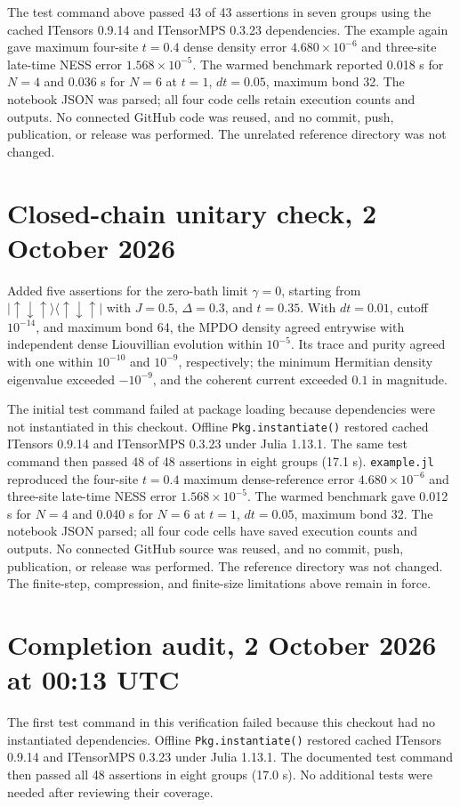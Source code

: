 \documentclass[11pt]{article}
\begin{document}
The test command above passed 43 of 43 assertions in seven groups using
the cached ITensors 0.9.14 and ITensorMPS 0.3.23 dependencies. The example
again gave maximum four-site $t=0.4$ dense density error
$4.680\times10^{-6}$ and three-site late-time NESS error
$1.568\times10^{-5}$. The warmed benchmark reported 0.018 s for $N=4$
and 0.036 s for $N=6$ at $t=1$, $dt=0.05$, maximum bond 32. The notebook
JSON was parsed; all four code cells retain execution counts and outputs.
No connected GitHub code was reused, and no commit, push, publication, or
release was performed. The unrelated reference directory was not changed.
\section*{Closed-chain unitary check, 2 October 2026}
Added five assertions for the zero-bath limit $\gamma=0$, starting from
$|\uparrow\downarrow\uparrow\rangle\langle\uparrow\downarrow\uparrow|$
with $J=0.5$, $\Delta=0.3$, and $t=0.35$. With $dt=0.01$, cutoff
$10^{-14}$, and maximum bond 64, the MPDO density agreed entrywise with
independent dense Liouvillian evolution within $10^{-5}$. Its trace and
purity agreed with one within $10^{-10}$ and $10^{-9}$, respectively;
the minimum Hermitian density eigenvalue exceeded $-10^{-9}$, and the
coherent current exceeded $0.1$ in magnitude.

The initial test command failed at package loading because dependencies
were not instantiated in this checkout. Offline \texttt{Pkg.instantiate()}
restored cached ITensors 0.9.14 and ITensorMPS 0.3.23 under Julia 1.13.1.
The same test command then passed 48 of 48 assertions in eight groups
(17.1 s). \texttt{example.jl} reproduced the four-site $t=0.4$ maximum
dense-reference error $4.680\times10^{-6}$ and three-site late-time NESS
error $1.568\times10^{-5}$. The warmed benchmark gave 0.012 s for
$N=4$ and 0.040 s for $N=6$ at $t=1$, $dt=0.05$, maximum bond 32.
The notebook JSON parsed; all four code cells have saved execution counts
and outputs. No connected GitHub source was reused, and no commit, push,
publication, or release was performed. The reference directory was not
changed. The finite-step, compression, and finite-size limitations above
remain in force.
\section*{Completion audit, 2 October 2026 at 00:13 UTC}
The first test command in this verification failed because this checkout had no instantiated dependencies.
Offline \texttt{Pkg.instantiate()} restored cached ITensors 0.9.14 and
ITensorMPS 0.3.23 under Julia 1.13.1. The documented test command then
passed all 48 assertions in eight groups (17.0 s). No additional tests
were needed after reviewing their coverage.
\end{document}
